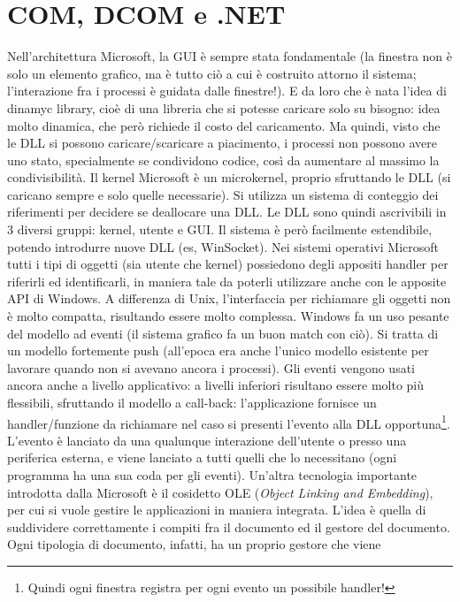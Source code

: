 \section{COM, DCOM e .NET}
Nell'architettura Microsoft, la GUI è sempre stata fondamentale (la finestra non è solo un elemento grafico, ma è tutto
ciò a cui è costruito attorno il sistema; l'interazione fra i processi è guidata dalle finestre!). E da loro che è nata
l'idea di dinamyc library, cioè di una libreria che si potesse caricare solo su bisogno: idea molto dinamica, che però
richiede il costo del caricamento.
Ma quindi, visto che le DLL si possono caricare/scaricare a piacimento, i processi non possono avere uno stato,
specialmente se condividono codice, così  da aumentare al massimo la condivisibilità. Il kernel Microsoft è un
microkernel, proprio sfruttando le DLL (si caricano sempre e solo quelle necessarie).
Si utilizza un sistema di conteggio dei riferimenti per decidere se deallocare una DLL.
Le DLL sono quindi ascrivibili in 3 diversi gruppi: kernel, utente e GUI. Il sistema è però facilmente
estendibile, potendo introdurre nuove DLL (es, WinSocket).
Nei sistemi operativi Microsoft tutti i tipi di oggetti (sia utente che kernel) possiedono degli appositi handler per
riferirli ed identificarli, in maniera tale da poterli utilizzare anche con le apposite API di Windows. A differenza di
Unix, l'interfaccia per richiamare gli oggetti non è molto compatta, risultando essere molto complessa.
Windows fa un uso pesante del modello ad eventi (il sistema grafico fa un buon match con ciò). Si tratta di un modello
fortemente push (all'epoca era anche l'unico modello esistente per lavorare quando non si avevano ancora i processi).
Gli eventi vengono usati ancora anche a livello applicativo: a livelli inferiori risultano essere molto più flessibili,
sfruttando il modello a call-back: l'applicazione fornisce un handler/funzione da richiamare nel caso si presenti
l'evento alla DLL opportuna\footnote{Quindi ogni finestra registra per ogni evento un possibile handler!}. L'evento è
lanciato da una qualunque interazione dell'utente o presso una periferica esterna, e viene lanciato a tutti quelli che
lo necessitano (ogni programma ha una sua coda per gli eventi).
Un'altra tecnologia importante introdotta dalla Microsoft è il cosidetto OLE (\textit{Object Linking and Embedding}),
per cui si vuole gestire le applicazioni in maniera integrata. L'idea è quella di suddividere correttamente i compiti
fra il documento ed il gestore del documento. Ogni tipologia di documento, infatti, ha un proprio gestore che viene
